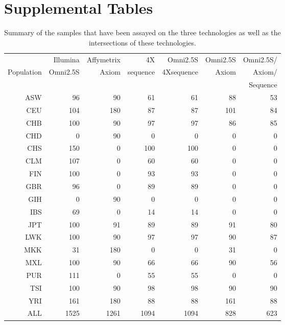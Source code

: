 \chapter{Supplemental Tables}
\begin{table}[ht]\footnotesize
\begin{center}
\begin{tabular}{ |r|rrrrrr|}
\hline
& Illumina  & Affymetrix & 4X &  Omni2.5S & Omni2.5S & Omni2.5S/\\
Population &  Omni2.5S & Axiom & sequence & 4Xsequence & Axiom &Axiom/ \\
& & & & &&Sequence \\
\hline

ASW & 96 & 90 & 61 & 61 & 88 & 53 \\ 
CEU & 104 & 180 & 87 & 87 & 101 & 84 \\ 
CHB & 100 & 90 & 97 & 97 & 86 & 85 \\ 
CHD & 0 & 90 & 0 & 0 & 0 & 0 \\ 
CHS & 150 & 0 & 100 & 100 & 0 & 0 \\ 
CLM & 107 & 0 & 60 & 60 & 0 & 0 \\ 
FIN & 100 & 0 & 93 & 93 & 0 & 0 \\ 
GBR & 96 & 0 & 89 & 89 & 0 & 0 \\ 
GIH & 0 & 90 & 0 & 0 & 0 & 0 \\ 
IBS & 69 & 0 & 14 & 14 & 0 & 0 \\ 
JPT & 100 & 91 & 89 & 89 & 91 & 80 \\ 
LWK & 100 & 90 & 97 & 97 & 90 & 87 \\ 
MKK & 31 & 180 & 0 & 0 & 31 & 0 \\ 
MXL & 100 & 90 & 66 & 66 & 90 & 56 \\ 
PUR & 111 & 0 & 55 & 55 & 0 & 0 \\ 
TSI & 100 & 90 & 98 & 98 & 90 & 90 \\ 
YRI & 161 & 180 & 88 & 88 & 161 & 88 \\ 
\hline
ALL & 1525 & 1261 & 1094 & 1094 & 828 & 623 \\ 
\hline

\end{tabular}
\caption[Summary of 1000 Genomes data used in genotype calling]{Summary of the samples that have been assayed on the three technologies as well as the intersections of these technologies.\label{sampleinfo}}
\label{chap2:sampleinfo}
\end{center}
\end{table}

